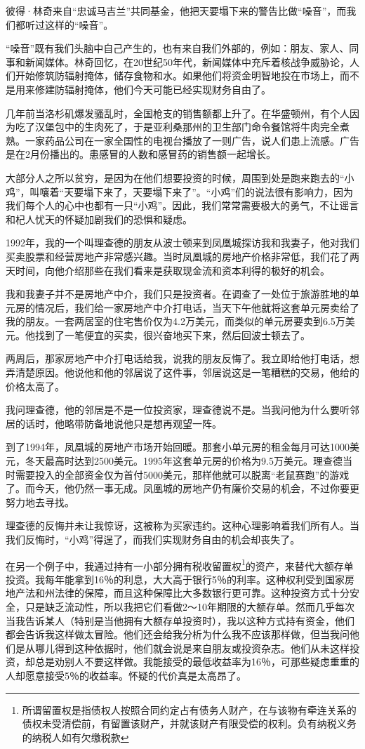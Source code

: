 彼得·林奇来自“忠诚马吉兰”共同基金，他把天要塌下来的警告比做“噪音”，而我们都听过这样的“噪音”。

“噪音”既有我们头脑中自己产生的，也有来自我们外部的，例如：朋友、家人、同事和新闻媒体。林奇回忆，在20世纪50年代，新闻媒体中充斥着核战争威胁论，人们开始修筑防辐射掩体，储存食物和水。如果他们将资金明智地投在市场上，而不是用来修建防辐射掩体，他们今天可能已经实现财务自由了。

几年前当洛杉矶爆发骚乱时，全国枪支的销售额都上升了。在华盛顿州，有个人因为吃了汉堡包中的生肉死了，于是亚利桑那州的卫生部门命令餐馆将牛肉完全煮熟。一家药品公司在一家全国性的电视台播放了一则广告，说人们患上流感。广告是在2月份播出的。患感冒的人数和感冒药的销售额一起增长。

大部分人之所以贫穷，是因为在他们想要投资的时候，周围到处是跑来跑去的“小鸡”，叫嚷着“天要塌下来了，天要塌下来了”。“小鸡”们的说法很有影响力，因为我们每个人的心中也都有一只“小鸡”。因此，我们常常需要极大的勇气，不让谣言和杞人忧天的怀疑加剧我们的恐惧和疑虑。

1992年，我的一个叫理查德的朋友从波士顿来到凤凰城探访我和我妻子，他对我们买卖股票和经营房地产非常感兴趣。当时凤凰城的房地产价格非常低，我们花了两天时间，向他介绍那些在我们看来是获取现金流和资本利得的极好的机会。

我和我妻子并不是房地产中介，我们只是投资者。在调查了一处位于旅游胜地的单元房的情况后，我们给一家房地产中介打电话，当天下午他就将这套单元房卖给了我的朋友。一套两居室的住宅售价仅为4.2万美元，而类似的单元房要卖到6.5万美元。他找到了一笔便宜的买卖，很兴奋地买下来，然后回波士顿去了。

两周后，那家房地产中介打电话给我，说我的朋友反悔了。我立即给他打电话，想弄清楚原因。他说他和他的邻居说了这件事，邻居说这是一笔糟糕的交易，他给的价格太高了。

我问理查德，他的邻居是不是一位投资家，理查德说不是。当我问他为什么要听邻居的话时，他略带防备地说他只是想再观望一阵。

到了1994年，凤凰城的房地产市场开始回暖。那套小单元房的租金每月可达1000美元，冬天最高时达到2500美元。1995年这套单元房的价格为9.5万美元。理查德当时需要投入的全部资金仅为首付5000美元，那样他就可以脱离“老鼠赛跑”的游戏了。而今天，他仍然一事无成。凤凰城的房地产仍有廉价交易的机会，不过你要更努力地去寻找。

理查德的反悔并未让我惊讶，这被称为买家违约。这种心理影响着我们所有人。当我们反悔时，“小鸡”得逞了，而我们实现财务自由的机会却丧失了。

在另一个例子中，我通过持有一小部分拥有税收留置权\footnote{所谓留置权是指债权人按照合同约定占有债务人财产，在与该物有牵连关系的债权未受清偿前，有留置该财产，并就该财产有限受偿的权利。负有纳税义务的纳税人如有欠缴税款}的资产，来替代大额存单投资。我每年能拿到16％的利息，大大高于银行5％的利率。这种权利受到国家房地产法和州法律的保障，而且这种保障比大多数银行更可靠。这种投资方式十分安全，只是缺乏流动性，所以我把它们看做2～10年期限的大额存单。然而几乎每次当我告诉某人（特别是当他拥有大额存单投资时），我以这种方式持有资金，他们都会告诉我这样做太冒险。他们还会给我分析为什么我不应该那样做，但当我问他们是从哪儿得到这种依据时，他们就会说是来自朋友或投资杂志。他们从未这样投资，却总是劝别人不要这样做。我能接受的最低收益率为16％，可那些疑虑重重的人却愿意接受5％的收益率。怀疑的代价真是太高昂了。

